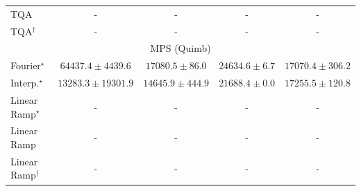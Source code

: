 \begin{tabular}{l|cccc|}
TQA & {\cellcolor[HTML]{000000}} \color[HTML]{F1F1F1} {\cellcolor{white}} \color{black} - & {\cellcolor[HTML]{000000}} \color[HTML]{F1F1F1} {\cellcolor{white}} \color{black} - & {\cellcolor[HTML]{000000}} \color[HTML]{F1F1F1} {\cellcolor{white}} \color{black} - & {\cellcolor[HTML]{000000}} \color[HTML]{F1F1F1} {\cellcolor{white}} \color{black} - \\
TQA$^\dagger$ & {\cellcolor[HTML]{000000}} \color[HTML]{F1F1F1} {\cellcolor{white}} \color{black} - & {\cellcolor[HTML]{000000}} \color[HTML]{F1F1F1} {\cellcolor{white}} \color{black} - & {\cellcolor[HTML]{000000}} \color[HTML]{F1F1F1} {\cellcolor{white}} \color{black} - & {\cellcolor[HTML]{000000}} \color[HTML]{F1F1F1} {\cellcolor{white}} \color{black} - \\
\cline{1-5}
\multicolumn{5}{c}{\rule{0pt}{8pt}MPS (Quimb)} \\
\midrule
Fourier$^\star$ & {\cellcolor[HTML]{C44802}} \color[HTML]{F1F1F1} $64437.4\pm 4439.6$ & {\cellcolor[HTML]{FFFBD3}} \color[HTML]{000000} $17080.5\pm 86.0$ & {\cellcolor[HTML]{FFF0AD}} \color[HTML]{000000} $24634.6\pm 6.7$ & {\cellcolor[HTML]{FFFBD3}} \color[HTML]{000000} $17070.4\pm 306.2$ \\
Interp.$^\star$ & {\cellcolor[HTML]{FFFFE5}} \color[HTML]{000000} $13283.3\pm 19301.9$ & {\cellcolor[HTML]{FFFEDF}} \color[HTML]{000000} $14645.9\pm 444.9$ & {\cellcolor[HTML]{FFF7BC}} \color[HTML]{000000} $21688.4\pm 0.0$ & {\cellcolor[HTML]{FFFBD2}} \color[HTML]{000000} $17255.5\pm 120.8$ \\
Linear Ramp$^\star$ & {\cellcolor[HTML]{000000}} \color[HTML]{F1F1F1} {\cellcolor{white}} \color{black} - & {\cellcolor[HTML]{000000}} \color[HTML]{F1F1F1} {\cellcolor{white}} \color{black} - & {\cellcolor[HTML]{000000}} \color[HTML]{F1F1F1} {\cellcolor{white}} \color{black} - & {\cellcolor[HTML]{000000}} \color[HTML]{F1F1F1} {\cellcolor{white}} \color{black} - \\
Linear Ramp & {\cellcolor[HTML]{000000}} \color[HTML]{F1F1F1} {\cellcolor{white}} \color{black} - & {\cellcolor[HTML]{000000}} \color[HTML]{F1F1F1} {\cellcolor{white}} \color{black} - & {\cellcolor[HTML]{000000}} \color[HTML]{F1F1F1} {\cellcolor{white}} \color{black} - & {\cellcolor[HTML]{000000}} \color[HTML]{F1F1F1} {\cellcolor{white}} \color{black} - \\
Linear Ramp$^\dagger$ & {\cellcolor[HTML]{000000}} \color[HTML]{F1F1F1} {\cellcolor{white}} \color{black} - & {\cellcolor[HTML]{000000}} \color[HTML]{F1F1F1} {\cellcolor{white}} \color{black} - & {\cellcolor[HTML]{000000}} \color[HTML]{F1F1F1} {\cellcolor{white}} \color{black} - & {\cellcolor[HTML]{000000}} \color[HTML]{F1F1F1} {\cellcolor{white}} \color{black} - \\

\end{tabular}
